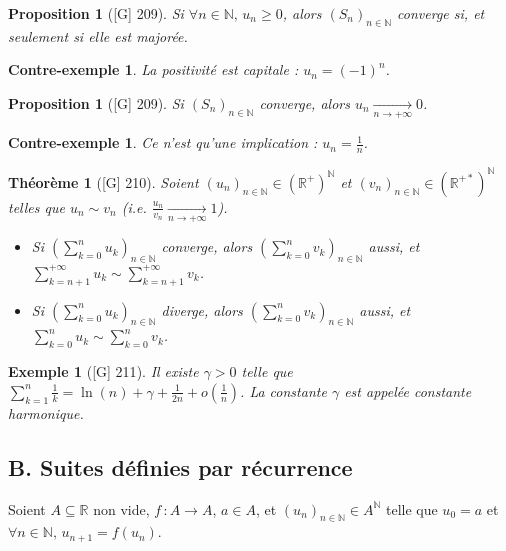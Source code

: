 \documentclass[10pt, a4paper, parskip=full, twoside, twocolumn]{report}
\newtheorem{theorem}[definition]{Théorème}
\newtheorem{proposition}[definition]{Proposition}
\newtheorem{example}[definition]{Exemple}
\newtheorem{cexample}[definition]{Contre-exemple}
\newcommand{\IN}{\mathbb{N}}
\newcommand{\IR}{\mathbb{R}}
\begin{document}
\begin{proposition}[\textnormal{[G] 209}]
	Si $\forall n\in\IN,\, u_n\geq 0$, alors $\left(S_n\right)_{n\in\IN}$ converge si, et seulement si elle est majorée.
\end{proposition}

\begin{cexample}
	La positivité est capitale : $u_n = (-1)^n$.
\end{cexample}

\begin{proposition}[\textnormal{[G] 209}]
	Si $\left(S_n\right)_{n\in\IN}$ converge, alors $\displaystyle{u_n\xrightarrow[n\to +\infty]{} 0}$.
\end{proposition}

\begin{cexample}
	Ce n'est qu'une implication : $u_n = \frac{1}{n}$.
\end{cexample}

\begin{theorem}[\textnormal{[G] 210}]
	Soient $\left(u_n\right)_{n\in\IN}\in\left(\IR^+\right)^{\IN}$ et $\left(v_n\right)_{n\in\IN}\in\left(\IR^{+*}\right)^{\IN}$ telles que $u_n\sim v_n$ (\emph{i.e.} $\frac{u_n}{v_n}\xrightarrow[n\to +\infty]{} 1$).
	\begin{itemize}
		\item Si $\left(\sum_{k=0}^{n}u_k\right)_{n\in\IN}$ converge, alors $\left(\sum_{k=0}^{n}v_k\right)_{n\in\IN}$ aussi, et $\sum_{k=n+1}^{+\infty}u_k\sim \sum_{k=n+1}^{+\infty}v_k$.
		\item Si $\left(\sum_{k=0}^{n}u_k\right)_{n\in\IN}$ diverge, alors $\left(\sum_{k=0}^{n}v_k\right)_{n\in\IN}$ aussi, et $\sum_{k=0}^{n}u_k\sim \sum_{k=0}^{n}v_k$.
	\end{itemize}
\end{theorem}

\begin{example}[\textnormal{[G] 211}]
	Il existe $\gamma > 0$ telle que $\sum_{k=1}^{n} \frac{1}{k} = \ln(n)+\gamma + \frac{1}{2n} + o(\frac{1}{n})$.
	La constante $\gamma$ est appelée \emph{constante harmonique}.
\end{example}

\subsection*{B. Suites définies par récurrence}

\textcolor{paragraphtext}{Soient $A\subseteq \IR$ non vide, $f\,\colon A\to A$, $a\in A$, et $\left(u_n\right)_{n\in\IN}\in A^{\IN}$ telle que $u_0 = a$ et $\forall n\in\IN,\, u_{n+1} = f(u_n)$.}
\end{document}
